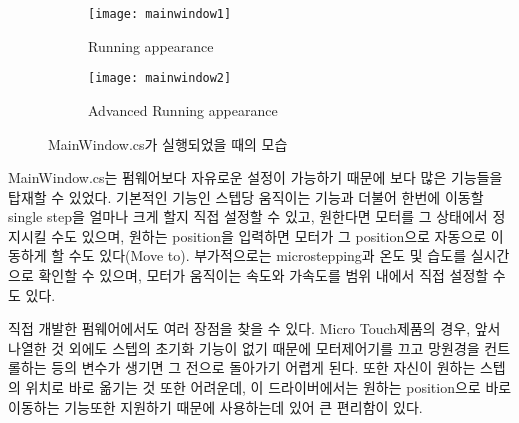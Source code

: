 \begin{figure}[h]
	\begin{subfigure}{0.5\textwidth}
		\begin{center}
			\texttt{[image: mainwindow1]} 
		\end{center}	
		\caption{Running appearance}
		\label{fig:mainwindow1}
	\end{subfigure}
	\begin{subfigure}{0.5\textwidth}
		\begin{center}			
			\texttt{[image: mainwindow2]}
		\end{center}
		\caption{Advanced Running appearance}
		\label{fig:mainwindow2}
	\end{subfigure}
	\caption{MainWindow.cs가 실행되었을 때의 모습}
	\label{fig:mainwindow}
\end{figure}

MainWindow.cs는 펌웨어보다 자유로운 설정이 가능하기 때문에 보다 많은 기능들을 탑재할 수 있었다. 기본적인 기능인 스텝당 움직이는 기능과 더불어 한번에 이동할 single step을 얼마나 크게 할지 직접 설정할 수 있고, 원한다면 모터를 그 상태에서 정지시킬 수도 있으며, 원하는 position을 입력하면 모터가 그 position으로 자동으로 이동하게 할 수도 있다(Move to). 부가적으로는 microstepping과 온도 및 습도를 실시간으로 확인할 수 있으며, 모터가 움직이는 속도와 가속도를 범위 내에서 직접 설정할 수도 있다.


직접 개발한 펌웨어에서도 여러 장점을 찾을 수 있다. Micro Touch제품의 경우, 앞서 나열한 것 외에도 스텝의 초기화 기능이 없기 때문에 모터제어기를 끄고 망원경을 컨트롤하는 등의 변수가 생기면 그 전으로 돌아가기 어렵게 된다. 또한 자신이 원하는 스텝의 위치로 바로 옮기는 것 또한 어려운데, 이 드라이버에서는 원하는 position으로 바로 이동하는 기능또한 지원하기 때문에 사용하는데 있어 큰 편리함이 있다. 


